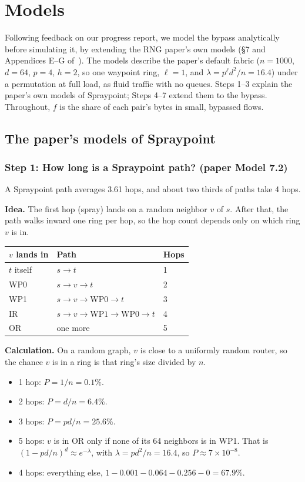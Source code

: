 \section{Models}
\label{sec:models}

Following feedback on our progress report, we model the bypass analytically before simulating it, by extending the RNG paper's own models (§7 and Appendices E--G of~\cite{rng}). The models describe the paper's default fabric ($n = 1000$, $d = 64$, $p = 4$, $h = 2$, so one waypoint ring, $\ell = 1$, and $\lambda = p^{\ell} d^2/n = 16.4$) under a permutation at full load, as fluid traffic with no queues. Steps 1--3 explain the paper's own models of Spraypoint; Steps 4--7 extend them to the bypass. Throughout, $f$ is the share of each pair's bytes in small, bypassed flows.

\subsection{The paper's models of Spraypoint}

\subsubsection{Step 1: How long is a Spraypoint path? (paper Model 7.2)}

A Spraypoint path averages 3.61 hops, and about two thirds of paths take 4 hops.

\textbf{Idea.} The first hop (spray) lands on a random neighbor $v$ of $s$. After that, the path walks inward one ring per hop, so the hop count depends only on which ring $v$ is in.

\begin{center}
\begin{tabular}{@{}lll@{}}
\toprule
$v$ lands in & Path & Hops \\
\midrule
$t$ itself & $s \to t$ & 1 \\
WP0 & $s \to v \to t$ & 2 \\
WP1 & $s \to v \to \text{WP0} \to t$ & 3 \\
IR & $s \to v \to \text{WP1} \to \text{WP0} \to t$ & 4 \\
OR & one more & 5 \\
\bottomrule
\end{tabular}
\end{center}

\textbf{Calculation.} On a random graph, $v$ is close to a uniformly random router, so the chance $v$ is in a ring is that ring's size divided by $n$.
\begin{itemize}
  \item 1 hop: $P = 1/n = 0.1\%$.
  \item 2 hops: $P = d/n = 6.4\%$.
  \item 3 hops: $P = p d / n = 25.6\%$.
  \item 5 hops: $v$ is in OR only if none of its 64 neighbors is in WP1. That is $(1 - pd/n)^d \approx e^{-\lambda}$, with $\lambda = p d^2 / n = 16.4$, so $P \approx 7 \times 10^{-8}$.
  \item 4 hops: everything else, $1 - 0.001 - 0.064 - 0.256 - 0 = 67.9\%$.
\end{itemize}

